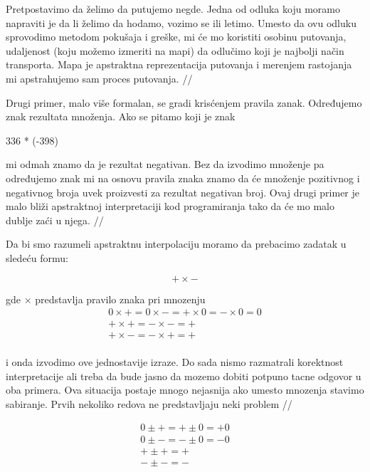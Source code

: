 \documentclass[a4paper]{article}
\begin{document}
{Pretpostavimo da želimo da putujemo negde. Jedna od odluka koju moramo napraviti je da li želimo da hodamo, vozimo se ili letimo. Umesto da ovu odluku sprovodimo metodom pokušaja i greške, mi će mo koristiti osobinu putovanja, udaljenost (koju možemo izmeriti na mapi) da odlučimo koji je najbolji način transporta. Mapa je apstraktna reprezentacija putovanja i merenjem rastojanja mi apstrahujemo sam proces putovanja. //

Drugi primer, malo više formalan, se gradi krisćenjem pravila zanak. Određujemo znak rezultata množenja. Ako se pitamo koji je znak

336 * (-398)  

mi odmah znamo da je rezultat negativan. Bez da izvodimo množenje pa određujemo znak mi na osnovu pravila znaka znamo da će množenje pozitivnog i negativnog broja uvek proizvesti za rezultat negativan broj. Ovaj drugi primer je malo bliži apstraktnoj interpretaciji kod programiranja tako da će mo malo dublje zaći u njega. //

Da bi smo razumeli apstraktnu interpolaciju moramo da prebacimo zadatak u sledeću formu:

\begin{equation}
  + \times -
\end{equation}

gde $\times$ predstavlja pravilo znaka pri mnozenju \\

\begin{multline}
  	0 \times + = 0 \times - = + \times 0 = - \times 0 = 0 \\
  	+ \times + = - \times - = + \\
  	+ \times - = - \times + = + \\
\end{multline}

i onda izvodimo ove jednostavije izraze. Do sada nismo razmatrali korektnost interpretacije ali treba da bude jasno da mozemo dobiti potpuno tacne odgovor u oba primera. Ova situacija postaje mnogo nejasnija ako umesto mnozenja stavimo sabiranje. Prvih nekoliko redova ne predstavljaju neki problem //

\begin{multline}
	0 \pm + = + \pm 0 = +0 \\ 
	0 \pm - = - \pm 0 = -0 \\ 
	+ \pm + = +  \\ 
	- \pm - = -  \\ 
\end{multline}


}
\end{document}
